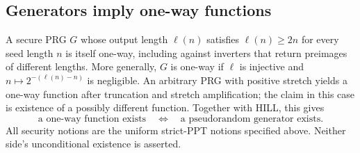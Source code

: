 \begin{result}
\subsection{Generators imply one-way functions}
A secure PRG $G$ whose output length $\ell(n)$ satisfies $\ell(n)\ge2n$
for every seed length $n$ is itself one-way, including against inverters that
return preimages of different lengths. More generally, $G$ is one-way if
$\ell$ is injective and $n\mapsto2^{-(\ell(n)-n)}$ is negligible.
An arbitrary PRG with positive stretch yields a one-way function after
truncation and stretch amplification; the claim in this case is existence of
a possibly different function. Together with HILL, this gives
\[
\text{a one-way function exists}\quad\Longleftrightarrow\quad
\text{a pseudorandom generator exists}.
\]
All security notions are the uniform strict-PPT notions specified above.
Neither side's unconditional existence is asserted.\citep{KatzLindell2020,HILL1999}
\end{result}

